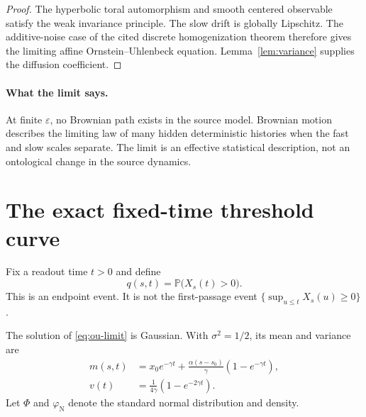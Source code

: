 \documentclass[11pt]{article}
\newcommand{\Pp}{\mathbb{P}}
\newcommand{\varphiN}{\varphi_{\mathrm{N}}}
\begin{document}
\begin{proof}
The hyperbolic toral automorphism and smooth centered observable satisfy the weak invariance principle. The slow drift is globally Lipschitz. The additive-noise case of the cited discrete homogenization theorem therefore gives the limiting affine Ornstein--Uhlenbeck equation. Lemma~\ref{lem:variance} supplies the diffusion coefficient.
\end{proof}

\paragraph{What the limit says.}
At finite \(\varepsilon\), no Brownian path exists in the source model. Brownian motion describes the limiting law of many hidden deterministic histories when the fast and slow scales separate. The limit is an effective statistical description, not an ontological change in the source dynamics.

\section{The exact fixed-time threshold curve}

Fix a readout time \(t>0\) and define
\[
q(s,t)=\Pp\bigl(X_s(t)>0\bigr).
\]
This is an endpoint event. It is not the first-passage event
\(\{\sup_{u\le t}X_s(u)\ge0\}\).

The solution of \eqref{eq:ou-limit} is Gaussian. With
\(\sigma^2=1/2\), its mean and variance are
\begin{align}
m(s,t)
&=
x_0e^{-\gamma t}
+\frac{\alpha(s-s_0)}{\gamma}
\left(1-e^{-\gamma t}\right),
\label{eq:mean}\\
v(t)
&=
\frac{1}{4\gamma}
\left(1-e^{-2\gamma t}\right).
\label{eq:variance}
\end{align}
Let \(\Phi\) and \(\varphiN\) denote the standard normal distribution and density.
\end{document}
